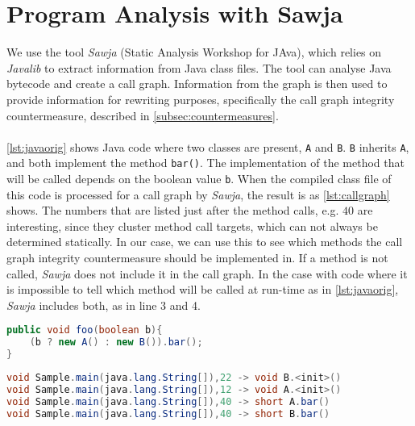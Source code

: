 \section{Program Analysis with Sawja}
We use the tool \textit{Sawja} (Static Analysis Workshop for JAva)\cite{sawja}, which relies on \textit{Javalib} to extract information from Java class files. The tool can analyse Java bytecode and create a call graph. Information from the graph is then used to provide information for rewriting purposes, specifically the call graph integrity countermeasure, described in \cref{subsec:countermeasures}.\\\\
\cref{lst:javaorig} shows Java code where two classes are present, \texttt{A} and \texttt{B}. \texttt{B} inherits \texttt{A}, and both implement the method \texttt{bar()}. The implementation of the method that will be called depends on the boolean value \texttt{b}. When the compiled class file of this code is processed for a call graph by \textit{Sawja}, the result is as \cref{lst:callgraph} shows. The numbers that are listed just after the method calls, e.g. $40$ are interesting, since they cluster method call targets, which can not always be determined statically. In our case, we can use this to see which methods the call graph integrity countermeasure should be implemented in. If a method is not called, \textit{Sawja} does not include it in the call graph.
In the case with code where it is impossible to tell which method will be called at run-time as in \cref{lst:javaorig}, \textit{Sawja} includes both, as in line 3 and 4.

\begin{minipage}{\linewidth}
\begin{lstlisting}[caption=Java sample.,language=Java,label=lst:javaorig]
public void foo(boolean b){
    (b ? new A() : new B()).bar();
}
\end{lstlisting}
\end{minipage}

\begin{minipage}{\linewidth} %
\begin{lstlisting}[caption=Call graph generated by \textit{Sawja}.,language=Java,label=lst:callgraph]
void Sample.main(java.lang.String[]),22 -> void B.<init>()
void Sample.main(java.lang.String[]),12 -> void A.<init>()
void Sample.main(java.lang.String[]),40 -> short A.bar()
void Sample.main(java.lang.String[]),40 -> short B.bar()
\end{lstlisting}
\end{minipage}

